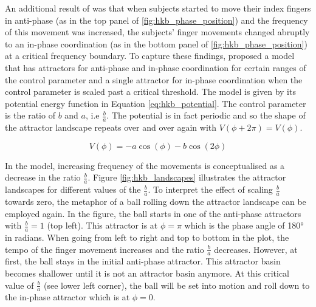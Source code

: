 An additional result of \citet{Kelso1981} was that when subjects started to move their index fingers in anti-phase (as in the top panel of \ref{fig:hkb_phase_position}) and the frequency of this movement was increased, the subjects' finger movements changed abruptly to an in-phase coordination (as in the bottom panel of \ref{fig:hkb_phase_position}) at a critical frequency boundary. To capture these findings, \citet{HakenKelsoBunz1985} proposed a model that has attractors for anti-phase and in-phase coordination for certain ranges of the control parameter and a single attractor for in-phase coordination when the control parameter is scaled past a critical threshold. The model is given by its potential energy function in Equation \ref{eq:hkb_potential}. The control parameter is the ratio of $b$ and $a$, i.e $\frac{b}{a}$. \newpage The potential is in fact periodic and so the shape of the attractor landscape repeats over and over again with $V(\phi + 2\pi) = V(\phi)$. 

\begin{equation}
V(\phi) = -a \cos(\phi) - b \cos( 2 \phi)
\label{eq:hkb_potential}
\end{equation}

In the model, increasing frequency of the movements is conceptualised as a decrease in the ratio $\frac{b}{a}$. Figure \ref{fig:hkb_landscapes} illustrates the attractor landscapes for different values of the $\frac{b}{a}$. To interpret the effect of scaling $\frac{b}{a}$ towards zero, the metaphor of a ball rolling down the attractor landscape can be employed again. In the figure, the ball starts in one of the anti-phase attractors with $\frac{b}{a} = 1$ (top left). This attractor is at $\phi = \pi$ which is the phase angle of 180° in radians. When going from left to right and top to bottom in the plot, the tempo of the finger movement increases and the ratio $\frac{b}{a}$ decreases. However, at first, the ball stays in the initial anti-phase attractor. This attractor basin becomes shallower until it is not an attractor basin anymore. At this critical value of $\frac{b}{a}$ (see lower left corner), the ball will be set into motion and roll down to the in-phase attractor which is at $\phi = 0$.

